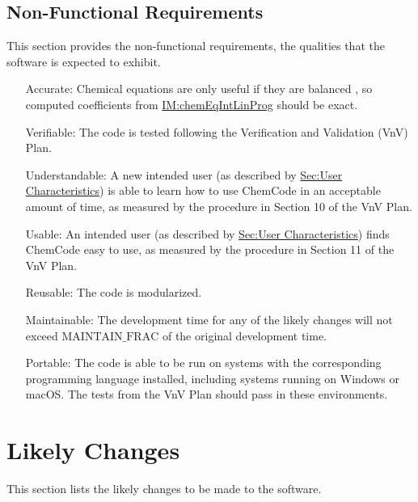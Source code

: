 \documentclass[12pt]{article}
\begin{document}
\subsection{Non-Functional Requirements}
\label{Sec:NFRs}
This section provides the non-functional requirements, the qualities that the software is expected to exhibit.

\begin{itemize}
\item[Accurate:\phantomsection\label{accurate}]{Chemical equations are only useful if they are balanced \cite{lund2023}, so computed coefficients from \hyperref[IM:chemEqIntLinProg]{IM:chemEqIntLinProg} should be exact.}
\item[Verifiable:\phantomsection\label{verifiable}]{The code is tested following the Verification and Validation (VnV) Plan.}
\item[Understandable:\phantomsection\label{understandable}]{A new intended user (as described by \hyperref[Sec:UserChars]{Sec:User Characteristics}) is able to learn how to use ChemCode in an acceptable amount of time, as measured by the procedure in Section 10 of the VnV Plan.}
\item[Usable:\phantomsection\label{usable}]{An intended user (as described by \hyperref[Sec:UserChars]{Sec:User Characteristics}) finds ChemCode easy to use, as measured by the procedure in Section 11 of the VnV Plan.}
\item[Reusable:\phantomsection\label{reusable}]{The code is modularized.}
\item[Maintainable:\phantomsection\label{maintainable}]{The development time for any of the likely changes will not exceed $\text{MAINTAIN_FRAC}$ of the original development time.}
\item[Portable:\phantomsection\label{portable}]{The code is able to be run on systems with the corresponding programming language installed, including systems running on Windows or macOS. The tests from the VnV Plan should pass in these environments.}
\end{itemize}
\section{Likely Changes}
\label{Sec:LCs}
This section lists the likely changes to be made to the software.
\end{document}
